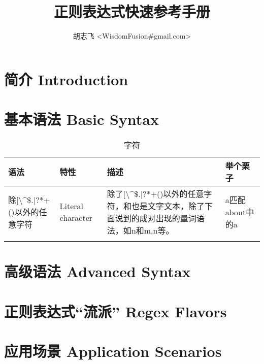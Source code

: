 \documentclass[12pt,a4paper,twoside]{ctexart}
\begin{document}
\title{正则表达式快速参考手册}
\author{胡志飞 <WisdomFusion\#gmail.com>}
\maketitle{}
\thispagestyle{empty}
\clearpage{}

\tableofcontents{}
\thispagestyle{empty}
\clearpage{}

\setcounter{page}{1}

\section[简介]{简介 Introduction}
\label{sec:intro}

\section[基本语法]{基本语法 Basic Syntax}
\label{sec:basic-syntax}

\begin{table}
\centering{}
\begin{tabularx}{\textwidth}{llXX}
\caption{字符}\\
\hline{}
语法 & 特性 & 描述 & 举个栗子 \\
\hline{}
除[\textbackslash{}\^{}\$.|?*+()以外的任意字符 & Literal character & 除了[\textbackslash{}\^{}\$.|?*+()以外的任意字符，{和}也是文字文本，除了下面说到的成对出现的量词语法，如{n}和{m,n}等。 & a匹配about中的a\\
\hline{}
\end{tabularx}
\end{table}

\section[高级语法]{高级语法 Advanced Syntax}
\label{sec:adv-syntax}


\section[正则表达式“流派”]{正则表达式“流派” Regex Flavors}
\label{sec:flavor}


\section[应用场景]{应用场景 Application Scenarios}
\label{sec:scenarios}
\end{document}
